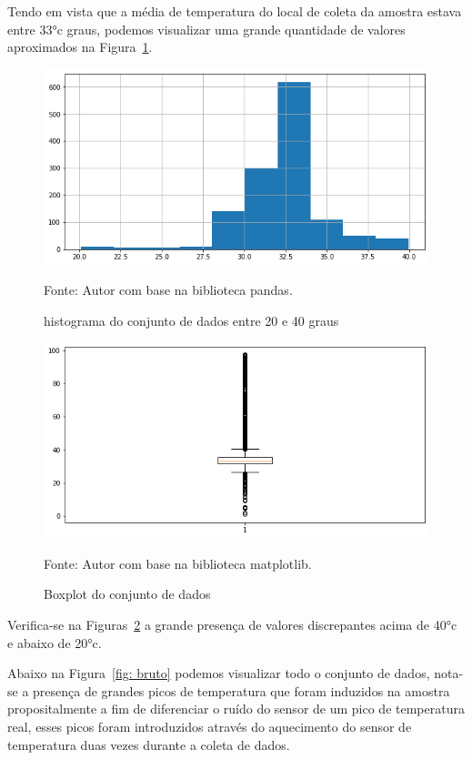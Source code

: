 Tendo em vista que a média de temperatura do local de coleta da amostra estava entre \ang{33}c graus, podemos visualizar uma grande quantidade de valores aproximados na Figura~\ref{fig: hist2}. 

\begin{figure}[H]
	\centering
	\includegraphics[width=15cm]{imagens/sensores/hist2.png}
	\caption{histograma do conjunto de dados entre 20 e 40 graus}
	Fonte: Autor com base na biblioteca pandas.
	\label{fig: hist2}
\end{figure}

\begin{figure}[H]
	\centering
	\includegraphics[width=15cm]{imagens/sensores/boxplot.png}
	\caption{Boxplot do conjunto de dados}
	Fonte: Autor com base na biblioteca matplotlib.
	\label{fig: boxplot}
\end{figure}

Verifica-se na Figuras~\ref{fig: boxplot} a grande presença de valores discrepantes acima de \ang{40}c e abaixo de \ang{20}c.

Abaixo na Figura~\ref{fig: bruto} podemos visualizar todo o conjunto de dados, nota-se a presença de grandes picos de temperatura que foram induzidos na amostra propositalmente a fim de diferenciar o ruído do sensor de um pico de temperatura real, esses picos foram introduzidos através do aquecimento do sensor de temperatura duas vezes durante a coleta de dados.



